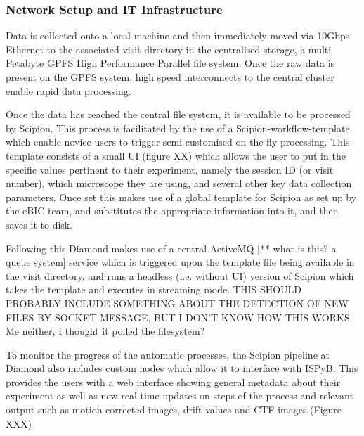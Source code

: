 \subsubsection{Network Setup and IT Infrastructure}

Data is collected onto a local machine %
and then immediately moved via 10Gbps Ethernet to the associated visit directory in the centralised storage, a multi Petabyte GPFS High Performance Parallel file system.  Once the raw data is present on the GPFS system, high speed interconnects to the central cluster enable rapid data processing. %

Once the data has reached the central file system, it is available to be processed by Scipion.  This process is facilitated by the use of a Scipion-workflow-template which enable novice users to trigger semi-customised on the fly processing. This template consists of a small UI (figure XX) which allows the user to put in the specific values pertinent to their experiment, namely the session ID (or visit number), which microscope they are using, and several other key data collection parameters.  Once set this makes use of a global template for Scipion as set up by the eBIC team, and substitutes the appropriate information into it, and then saves it to disk.

Following this Diamond makes use of a central ActiveMQ [** what is this? a queue system] service which is triggered upon the template file being available in the visit directory, and runs a headless (i.e. without UI) version of Scipion which takes the template and executes in streaming mode.  THIS SHOULD PROBABLY INCLUDE SOMETHING ABOUT THE DETECTION OF NEW FILES BY SOCKET MESSAGE, BUT I DON’T KNOW HOW THIS WORKS. Me neither, I thought it polled the filesystem?


To monitor the progress of the automatic processes, the Scipion pipeline at Diamond also includes custom nodes which allow it to interface with ISPyB.  This provides the users with a web interface showing general metadata about their experiment as well as new real-time updates on steps of the process and relevant output such as motion corrected images, drift values and CTF images (Figure XXX)